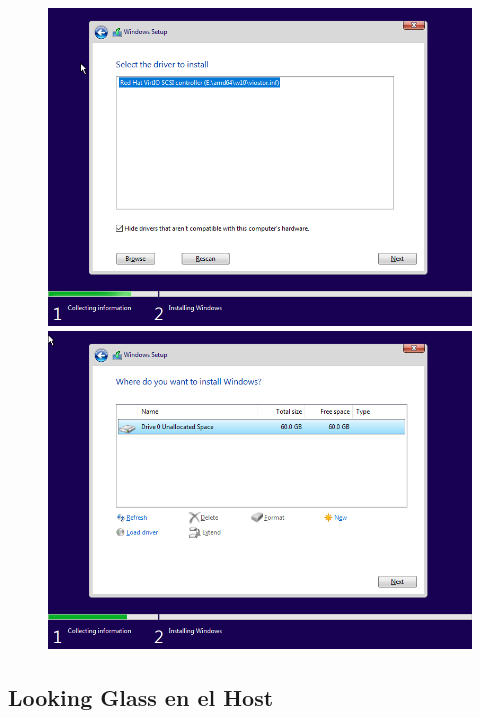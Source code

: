 \documentclass[12pt]{article}
\begin{document}
\begin{figure}[h!]
	\centering
	\begin{minipage}[b]{0.4965\textwidth}
		\includegraphics[width=\textwidth]{images/windows-setup-03.png}
	\end{minipage}
	\begin{minipage}[b]{0.4965\textwidth}
		\includegraphics[width=\textwidth]{images/windows-setup-04.png}
	\end{minipage}
\end{figure}

\subsection{Looking Glass en el Host}
\end{document}
